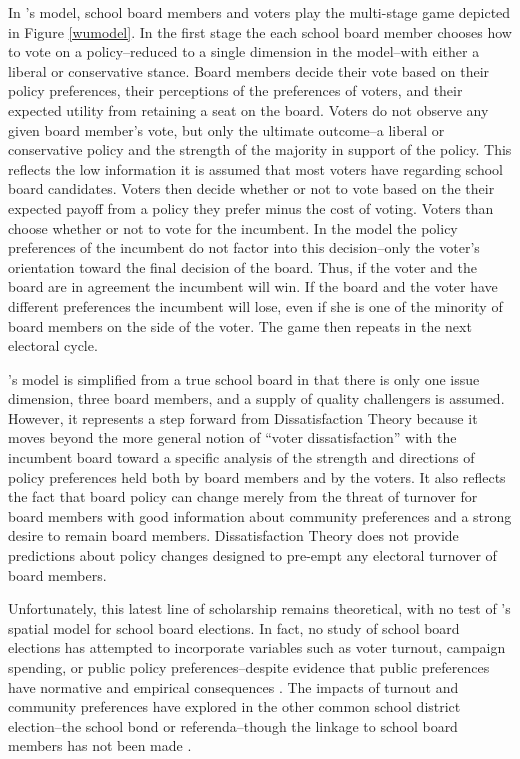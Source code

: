 In \citet{RefWorks:243}'s model, school board members and voters play the multi-stage game depicted in Figure \ref{wumodel}. In the first stage the each school board member chooses how to vote on a policy--reduced to a single dimension in the model--with either a liberal or conservative stance. Board members decide their vote based on their policy preferences, their perceptions of the preferences of voters, and their expected utility from retaining a seat on the board. Voters do not observe any given board member's vote, but only the ultimate outcome--a liberal or conservative policy and the strength of the majority in support of the policy. This reflects the low information it is assumed that most voters have regarding school board candidates. Voters then decide whether or not to vote based on the their expected payoff from a policy they prefer minus the cost of voting. Voters than choose whether or not to vote for the incumbent. In the model the policy preferences of the incumbent do not factor into this decision--only the voter's orientation toward the final decision of the board. Thus, if the voter and the board are in agreement the incumbent will win. If the board and the voter have different preferences the incumbent will lose, even if she is one of the minority of board members on the side of the voter. The game then repeats in the next electoral cycle. 

\citet{RefWorks:243}'s model is simplified from a true school board in that there is only one issue dimension, three board members, and a supply of quality challengers is assumed. However, it represents a step forward from Dissatisfaction Theory because it moves beyond the more general notion of ``voter dissatisfaction'' with the incumbent board toward a specific analysis of the strength and directions of policy preferences held both by board members and by the voters. It also reflects the fact that board policy can change merely from the threat of turnover for board members with good information about community preferences and a strong desire to remain board members. Dissatisfaction Theory does not provide predictions about policy changes designed to pre-empt any electoral turnover of board members.

Unfortunately, this latest line of scholarship remains theoretical, with no test of  \citet{RefWorks:243}'s spatial model for school board elections. In fact, no study of school board elections has attempted to incorporate variables such as voter turnout, campaign spending, or public policy preferences--despite evidence that public preferences have normative and empirical consequences \citep{RefWorks:228}.  The impacts of turnout and community preferences have explored in the other common school district election--the school bond or referenda--though the linkage to school board members has not been made \citep{RefWorks:342, RefWorks:343}.

